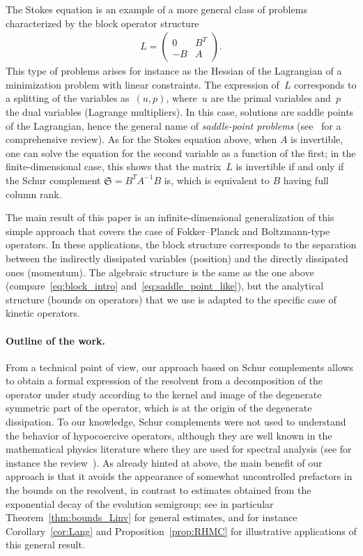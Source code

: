 \documentclass{article}
\begin{document}
The Stokes equation is an example of a more general class of problems
characterized by the block operator structure
\begin{align}
\label{eq:block_intro}
  L = \begin{pmatrix}
    0 & B^{T}\\
    -B & A
  \end{pmatrix}.
\end{align}
This type of problems arises for instance as the Hessian of the
Lagrangian of a minimization problem with linear constraints. The
expression of~$L$ corresponds to a splitting of the variables as~$(u,p)$, where~$u$ are the primal variables and~$p$ the dual variables
(Lagrange multipliers). In this
case, solutions are saddle points of the Lagrangian, hence the general
name of \textit{saddle-point problems} (see~\cite{benzi2005numerical}
for a comprehensive review). As for the Stokes equation above, when
$A$ is invertible, one can solve the equation for the second variable
as a function of the first; in the finite-dimensional case, this shows
that the matrix~$L$ is invertible if and only if the Schur complement
$\mathfrak{S} = B^{T} A^{-1} B$ is, which is equivalent to $B$ having full column
rank.

The main result of this paper is an infinite-dimensional
generalization of this simple approach that covers the case of
Fokker--Planck and Boltzmann-type operators. In these applications,
the block structure corresponds to the separation between the
indirectly dissipated variables (position) and the directly dissipated
ones (momentum). The algebraic structure is the same as the one above
(compare~\eqref{eq:block_intro} and~\eqref{eq:saddle_point_like}), but the analytical structure
(bounds on operators) that we use is adapted to the specific case of
kinetic operators.

\paragraph{Outline of the work.}
From a technical point of view, our approach based on Schur complements allows to obtain a formal expression of the resolvent from a decomposition of the operator under study according to the kernel and image of the degenerate symmetric part of the operator, which is at the origin of the degenerate dissipation. To our knowledge, Schur complements were not used to understand the behavior of hypocoercive operators, although they are well known in the mathematical physics literature where they are used for spectral analysis (see for instance the review~\cite{SZ07}). As already hinted at above, the main benefit of our approach is that it avoids the appearance of somewhat uncontrolled prefactors in the bounds on the resolvent, in contrast to estimates obtained from the exponential decay of the evolution semigroup; see in particular Theorem~\ref{thm:bounds_Linv} for general estimates, and for instance Corollary~\ref{cor:Lang} and Proposition~\ref{prop:RHMC} for illustrative applications of this general result. 
\end{document}
